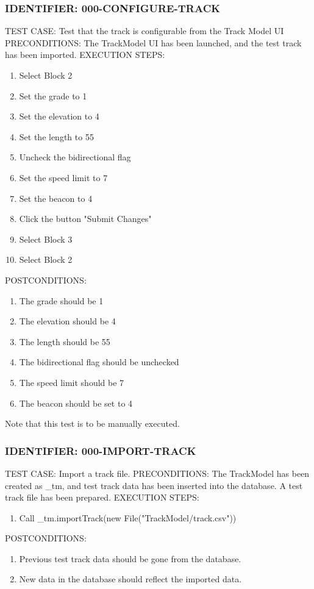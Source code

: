 \documentclass{scrreprt}
\begin{document}
\subsubsection{IDENTIFIER: 000-CONFIGURE-TRACK}
TEST CASE: Test that the track is configurable from the Track Model UI
PRECONDITIONS: The TrackModel UI has been launched, and the test track has been imported.
EXECUTION STEPS:
\begin{enumerate}
	\item Select Block 2
	\item Set the grade to 1
	\item Set the elevation to 4
	\item Set the length to 55
	\item Uncheck the bidirectional flag
	\item Set the speed limit to 7
	\item Set the beacon to 4
	\item Click the button "Submit Changes"
	\item Select Block 3
	\item Select Block 2
\end{enumerate}
POSTCONDITIONS:
\begin{enumerate}
	\item The grade should be 1
	\item The elevation should be 4
	\item The length should be 55
	\item The bidirectional flag should be unchecked
	\item The speed limit should be 7
	\item The beacon should be set to 4
\end{enumerate}

Note that this test is to be manually executed.

\subsubsection{IDENTIFIER: 000-IMPORT-TRACK}
TEST CASE: Import a track file.
PRECONDITIONS: The TrackModel has been created as _tm, and test track data has been inserted into the database. A test track file has been prepared.
EXECUTION STEPS:
\begin{enumerate}
	\item Call _tm.importTrack(new File("TrackModel/track.csv"))
\end{enumerate}
POSTCONDITIONS:
\begin{enumerate}
	\item Previous test track data should be gone from the database.
	\item New data in the database should reflect the imported data.
\end{enumerate}
\end{document}
